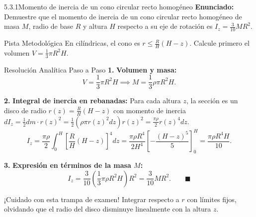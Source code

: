 \documentclass[11pt,a4paper]{article}
\begin{document}
\begin{nivelbox}{5.3.1}{Momento de inercia de un cono circular recto homogéneo}
\textbf{Enunciado:}\\
Demuestre que el momento de inercia de un cono circular recto homogéneo de masa $M$, radio de base $R$ y altura $H$ respecto a su eje de rotación es $I_z = \frac{3}{10} M R^2$.

\begin{observacionbox}{Pista Metodológica}
En cilíndricas, el cono es $r \le \frac{R}{H}(H - z)$. Calcule primero el volumen $V = \frac{1}{3}\pi R^2 H$.
\end{observacionbox}

\begin{ejerciciobox}{Resolución Analítica Paso a Paso}
\smallskip\noindent\textbf{1.} \textbf{Volumen y masa:}
\[V = \frac{1}{3} \pi R^2 H \implies M = \frac{1}{3} \rho \pi R^2 H.\]

\smallskip\noindent\textbf{2.} \textbf{Integral de inercia en rebanadas:}
Para cada altura $z$, la sección es un disco de radio $r(z) = \frac{R}{H}(H - z)$ con momento de inercia $dI_z = \frac{1}{2} dm \cdot r(z)^2 = \frac{1}{2} (\rho \pi r(z)^2 dz) r(z)^2 = \frac{\pi \rho}{2} r(z)^4 dz$.
\[I_z = \frac{\pi \rho}{2} \int_0^H \left[ \frac{R}{H}(H - z) \right]^4 dz = \frac{\pi \rho R^4}{2 H^4} \left[ -\frac{(H - z)^5}{5} \right]_0^H = \frac{\pi \rho R^4 H}{10}.\]

\smallskip\noindent\textbf{3.} \textbf{Expresión en términos de la masa $M$:}
\[I_z = \frac{3}{10} \left( \frac{1}{3} \pi \rho R^2 H \right) R^2 = \frac{3}{10} M R^2. \qquad \blacksquare\]
\end{ejerciciobox}

\begin{errorbox}{¡Cuidado con esta trampa de examen!}
Integrar respecto a $r$ con límites fijos, olvidando que el radio del disco disminuye linealmente con la altura $z$.
\end{errorbox}
\end{nivelbox}
\bigskip
\end{document}
